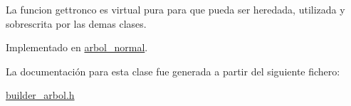 La funcion gettronco es virtual pura para que pueda ser heredada, utilizada y sobrescrita por las demas clases. 

Implementado en \hyperlink{classarbol__normal_a24fdce164b50a74414b6a3d5ad4e99f6}{arbol\+\_\+normal}.



La documentación para esta clase fue generada a partir del siguiente fichero\+:\begin{DoxyCompactItemize}
\item 
\hyperlink{builder__arbol_8h}{builder\+\_\+arbol.\+h}\end{DoxyCompactItemize}
